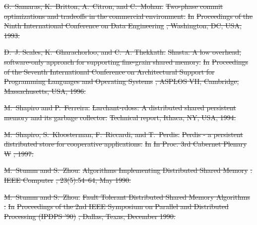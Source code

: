 \documentclass[sigconf]{acmart}
\renewcommand{\em}{\it}
\providecommand{\DIFdel}[1]{{\protect\color{red}\sout{#1}}}                      %
\begin{document}
{%
\DIFdel{G.~Samaras, K.~Britton, A.~Citron, and C.~Mohan.
}%
\DIFdel{Two-phase commit optimizations and tradeoffs in the commercial
  environment.
}%
\DIFdel{In }%
\DIFdel{Proceedings of the Ninth International Conference on Data
  Engineering}%
\DIFdel{, Washington, DC, USA, 1993.
}%

\DIFdel{D.~J. Scales, K.~Gharachorloo, and C.~A. Thekkath.
}%
\DIFdel{Shasta: A low overhead, software-only approach for supporting
  fine-grain shared memory.
}%
\DIFdel{In }%
\DIFdel{Proceedings of the Seventh International Conference on
  Architectural Support for Programming Languages and Operating Systems}%
\DIFdel{,
  ASPLOS VII, Cambridge, Massachusetts, USA, 1996.
}%

\DIFdel{M.~Shapiro and P.~Ferreira.
}%
\DIFdel{Larchant-rdoss: A distributed shared persistent memory and its
  garbage collector.
}%
\DIFdel{Technical report, Ithaca, NY, USA, 1994.
}%

\DIFdel{M.~Shapiro, S.~Kloosterman, F.~Riccardi, and T.~Perdis.
}%
\DIFdel{Perdis - a persistent distributed store for cooperative applications.
}%
\DIFdel{In }%
\DIFdel{In Proc. 3rd Cabernet Plenary W}%
\DIFdel{, 1997.
}%

\DIFdel{M.~Stumm and S.~Zhou.
}%
\DIFdel{Algorithms Implementing Distributed Shared Memory}%
\DIFdel{.
}%
\DIFdel{IEEE Computer}%
\DIFdel{, 23(5):54–64, May 1990.
}%

\DIFdel{M.~Stumm and S.~Zhou.
}%
\DIFdel{Fault Tolerant Distributed Shared Memory Algorithms}%
\DIFdel{.
}%
\DIFdel{In }%
\DIFdel{Proceedings of the 2nd IEEE Symposium on Parallel and
  Distributed Processing (IPDPS ’90)}%
\DIFdel{, Dallas, Texas, December 1990.
}%

}
\end{document}
